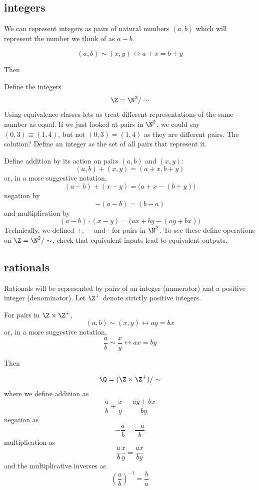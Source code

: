 \message{ !name(truth.tex)}\documentclass{scrbook}
\renewcommand{\iff}{\leftrightarrow}
\begin{document}
\subsection[Integers]{integers}
We can represent integers as pairs of natural numbers $(a,b)$ which will represent the number we think of as $a-b$. 
\begin{defn}[\sim]
  \[
  (a,b)\sim(x,y) \iff a+x=b+y
  \]
\end{defn}
Then 
\begin{defn}[$\Z$]
  Define the integers
  \[
  \Z=\N^2/\sim
  \]
  Using equivalence classes lets us treat different representations of the same number as equal. If we just looked at pairs in $\N^2$, we could say $(0,3)\equiv (1,4)$, but not $(0,3)=(1,4)$ as they are different pairs. The solution? Define an integer as the set of all pairs that represent it. 

  Define addition by its action on pairs $(a,b)$ and $(x,y)$:
  \[
  (a,b)+(x,y)=(a+x,b+y)
  \]
  or, in a more suggestive notation, 
  \[
  (a-b)+(x-y)=\bigl(a+x-(b+y)\bigr)
  \]
  negation by
  \[
  -(a-b)=(b-a)
  \]
  and multiplication by
  \[
  (a - b)\cdot(x-y)=\bigl(ax +by - (ay+bx)\bigr)
  \]
  Technically, we defined $+$, $-$ and $\cdot$ for pairs in $\N^2$. To see these define operations on $\Z=\N^2/\sim$, check that equivalent inputs lead to equivalent outputs. 
\end{defn}
\subsection[Rationals]{rationals}
Rationals will be represented by pairs of an integer (numerator) and a positive integer (denominator). Let $\Z^+$ denote strictly positive integers. 
\begin{defn}[\sim]
  For pairs in $\Z\times \Z^+$,
  \[
  (a,b)\sim(x,y) \iff ay=bx
  \]
  or, in a more suggestive notation, 
  \[
  \frac a b \sim \frac x y \iff ax = by
  \]
\end{defn}
Then
\begin{defn}[$\Q$]
  \[
  \Q=(\Z\times\Z^+)/\sim
  \]
  where we define addition as
  \[
  \frac ab + \frac xy = \frac{ay+bx}{by}
  \]
  negation as
  \[
  -\frac ab = \frac{-a}b
  \]
  multiplication as
  \[
  \frac ab \frac xy = \frac {ax}{by}
  \]
  and the multiplicative inverses as
  \[
  \left(\frac ab\right)^{-1} = \frac ba
  \]
\end{defn}
\end{document}

